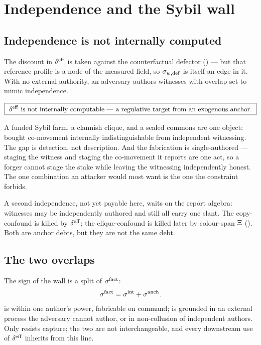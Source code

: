 \documentclass[../main]{subfiles}
\begin{document}
\section{Independence and the Sybil wall}
\label{sec:anchor}

\subsection{Independence is not internally computed}
\label{subsec:anchor:internal}
%
The discount in $\effdensity$ is taken against the counterfactual defector ()
--- but that reference profile is a node of the measured field, so
$\sigma\sb{w,\mathrm{def}}$ is itself an edge in it. With no external authority,
an adversary authors witnesses with overlap set to mimic independence.

\begin{theorem}
  \begin{equation}
    \boxed{\ \effdensity\ \text{is not internally computable --- a regulative target
      from an exogenous anchor.}\ }
    \label{eq:J:anchor}
  \end{equation}
\end{theorem}

A funded Sybil farm, a clannish clique, and a sealed commons are one object: bought
co-movement internally indistinguishable from independent witnessing. The gap is detection,
not description. And the fabrication is single-authored --- staging the witness and staging
the co-movement it reports are one act, so a forger cannot stage the stake while leaving the
witnessing independently honest. The one combination an attacker would most want is the one
the constraint forbids.

A second independence, not yet payable here, waits on the report algebra: witnesses may be
independently authored and still all carry one slant. The copy-confound is killed by
$\effdensity$; the clique-confound is killed later by colour-span $\Xi$ ().
Both are anchor debts, but they are not the same debt.

\subsection{The two overlaps}
\label{subsec:anchor:overlaps}
%
The sign of the wall is a split  of $\sigma\sp{\mathrm{fact}}$:
\begin{equation}
  \sigma\sp{\mathrm{fact}}=\sigma\sp{\mathrm{int}}+\sigma\sp{\mathrm{anch}}.
  \label{eq:anchor:split}
\end{equation}
 is within one author's power, fabricable on command;  is
grounded in an external process the adversary cannot author, or in non-collusion of
independent authors. Only  resists capture; the two are not interchangeable,
and every downstream use of $\effdensity$ inherits  from this line.
\end{document}
